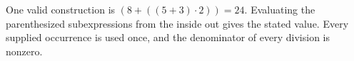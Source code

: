 One valid construction is $\boxed{(8+((5+3)\cdot 2))=24}$. Evaluating the parenthesized subexpressions from the inside out gives the stated value. Every supplied occurrence is used once, and the denominator of every division is nonzero.
